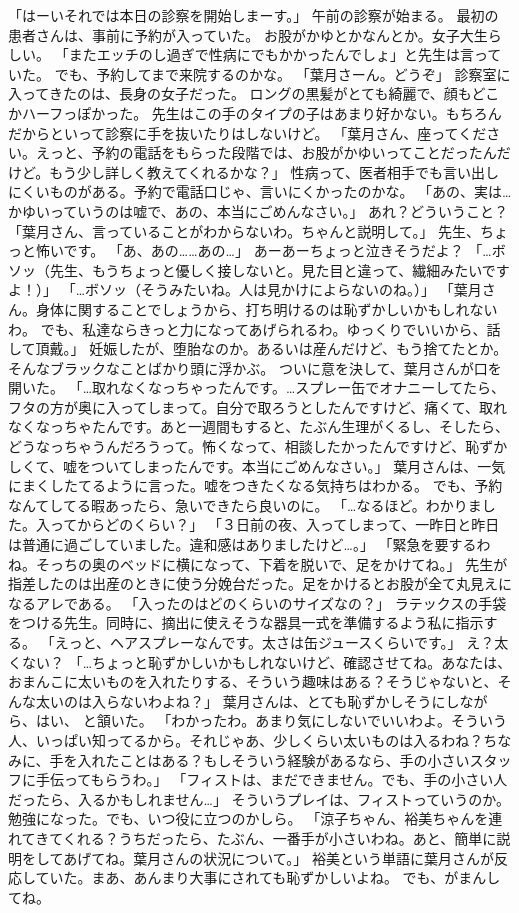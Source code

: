 「はーいそれでは本日の診察を開始しまーす。」
午前の診察が始まる。
最初の患者さんは、事前に予約が入っていた。
お股がかゆとかなんとか。女子大生らしい。
「またエッチのし過ぎで性病にでもかかったんでしょ」と先生は言っていた。
でも、予約してまで来院するのかな。
「葉月さーん。どうぞ」
診察室に入ってきたのは、長身の女子だった。
ロングの黒髪がとても綺麗で、顔もどこかハーフっぽかった。
先生はこの手のタイプの子はあまり好かない。もちろんだからといって診察に手を抜いたりはしないけど。
「葉月さん、座ってください。えっと、予約の電話をもらった段階では、お股がかゆいってことだったんだけど。もう少し詳しく教えてくれるかな？」
性病って、医者相手でも言い出しにくいものがある。予約で電話口じゃ、言いにくかったのかな。
「あの、実は…かゆいっていうのは嘘で、あの、本当にごめんなさい。」
あれ？どういうこと？
「葉月さん、言っていることがわからないわ。ちゃんと説明して。」
先生、ちょっと怖いです。
「あ、あの……あの…」
あーあーちょっと泣きそうだよ？
「…ボソッ（先生、もうちょっと優しく接しないと。見た目と違って、繊細みたいですよ！）」
「…ボソッ（そうみたいね。人は見かけによらないのね。）」
「葉月さん。身体に関することでしょうから、打ち明けるのは恥ずかしいかもしれないわ。
でも、私達ならきっと力になってあげられるわ。ゆっくりでいいから、話して頂戴。」
妊娠したが、堕胎なのか。あるいは産んだけど、もう捨てたとか。
そんなブラックなことばかり頭に浮かぶ。
ついに意を決して、葉月さんが口を開いた。
「…取れなくなっちゃったんです。…スプレー缶でオナニーしてたら、フタの方が奥に入ってしまって。自分で取ろうとしたんですけど、痛くて、取れなくなっちゃたんです。あと一週間もすると、たぶん生理がくるし、そしたら、どうなっちゃうんだろうって。怖くなって、相談したかったんですけど、恥ずかしくて、嘘をついてしまったんです。本当にごめんなさい。」
葉月さんは、一気にまくしたてるように言った。嘘をつきたくなる気持ちはわかる。
でも、予約なんてしてる暇あったら、急いできたら良いのに。
「…なるほど。わかりました。入ってからどのくらい？」
「３日前の夜、入ってしまって、一昨日と昨日は普通に過ごしていました。違和感はありましたけど…。」
「緊急を要するわね。そっちの奥のベッドに横になって、下着を脱いで、足をかけてね。」
先生が指差したのは出産のときに使う分娩台だった。足をかけるとお股が全て丸見えになるアレである。
「入ったのはどのくらいのサイズなの？」
ラテックスの手袋をつける先生。同時に、摘出に使えそうな器具一式を準備するよう私に指示する。
「えっと、ヘアスプレーなんです。太さは缶ジュースくらいです。」
え？太くない？
「…ちょっと恥ずかしいかもしれないけど、確認させてね。あなたは、おまんこに太いものを入れたりする、そういう趣味はある？そうじゃないと、そんな太いのは入らないわよね？」
葉月さんは、とても恥ずかしそうにしながら、はい、 と頷いた。
「わかったわ。あまり気にしないでいいわよ。そういう人、いっぱい知ってるから。それじゃあ、少しくらい太いものは入るわね？ちなみに、手を入れたことはある？もしそういう経験があるなら、手の小さいスタッフに手伝ってもらうわ。」
「フィストは、まだできません。でも、手の小さい人だったら、入るかもしれません…」
そういうプレイは、フィストっていうのか。勉強になった。でも、いつ役に立つのかしら。
「涼子ちゃん、裕美ちゃんを連れてきてくれる？うちだったら、たぶん、一番手が小さいわね。あと、簡単に説明をしてあげてね。葉月さんの状況について。」
裕美という単語に葉月さんが反応していた。まあ、あんまり大事にされても恥ずかしいよね。
でも、がまんしてね。

